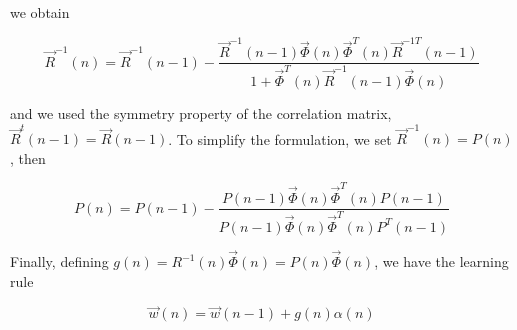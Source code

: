 \documentclass{article}
\begin{document}
\noindent we obtain

$$ \vec{R}^{-1} (n) = \vec{R}^{-1} (n - 1) - \dfrac{ \vec{R}^{-1} (n - 1) \vec{\Phi} (n) \vec{\Phi}^{T} (n) \vec{R}^{-1T} (n - 1)}{1 + \vec{\Phi}^{T} (n) \vec{R}^{-1} (n - 1) \vec{\Phi} (n)} $$

\noindent and we used the symmetry property of the correlation matrix, $ \vec{R}^{t} (n - 1) = \vec{R} (n - 1) $. To simplify the formulation, we set $ \vec{R}^{-1} (n) = P (n) $, then

$$ P(n) = P(n - 1) - \dfrac{P (n - 1) \vec{\Phi} (n) \vec{\Phi}^{T} (n) P (n - 1)}{P (n - 1) \vec{\Phi} (n) \vec{\Phi}^{T} (n) P ^{T} (n - 1)} $$

Finally, defining $ g (n) = R^{-1} (n) \vec{\Phi} (n) = P (n) \vec{\Phi} (n) $, we have the learning rule

$$ \vec{w} (n) = \vec{w} (n - 1 ) + g (n) \alpha (n)$$
\end{document}
